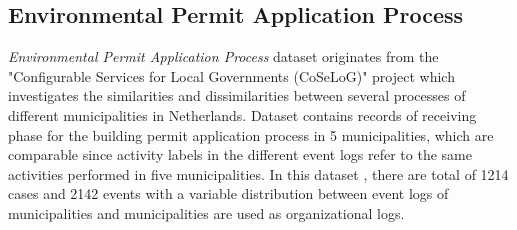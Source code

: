 \subsection{Environmental Permit Application Process}
\label{subsec:coselog-wabo-process}
\textit{Environmental Permit Application Process} dataset originates from the "Configurable Services for Local Governments (CoSeLoG)" project \cite{van2011business} which investigates the similarities and dissimilarities between several processes of different municipalities in Netherlands. Dataset contains records of receiving phase for the building permit application process in 5 municipalities, which are comparable since activity labels in the different event logs refer to the same activities performed in five municipalities. In this dataset \cite{coselog-data}, there are total of 1214 cases and 2142 events with a variable distribution between event logs of municipalities and municipalities are used as organizational logs.

